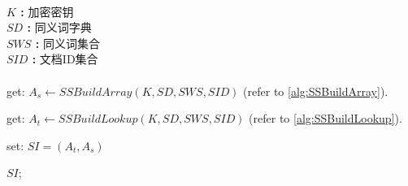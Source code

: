%
%
\begin{algorithm}[!htb]

%
\caption{ $SSBuildSI$ }

\label{alg:SSBuildSI}


\begin{algorithmic} [1]

\REQUIRE ~~\\

  \textbf{${K}$ :}   加密密钥    \\
  \textbf{${SD}$ :}  同义词字典  \\
  \textbf{${SWS}$ :} 同义词集合  \\
  \textbf{${SID}$ :} 文档ID集合  \\

\ENSURE ~~\\

\STATE get: $A_s \leftarrow SSBuildArray(K, SD, SWS, SID)$ (refer to \ref{alg:SSBuildArray}).

\STATE get: $A_t \leftarrow SSBuildLookup(K, SD, SWS, SID)$ (refer to \ref{alg:SSBuildLookup}).

\STATE set: ${ SI = (A_t, A_s) }$

%
%
\RETURN ${SI}$;

\end{algorithmic}

%
%
\end{algorithm}


